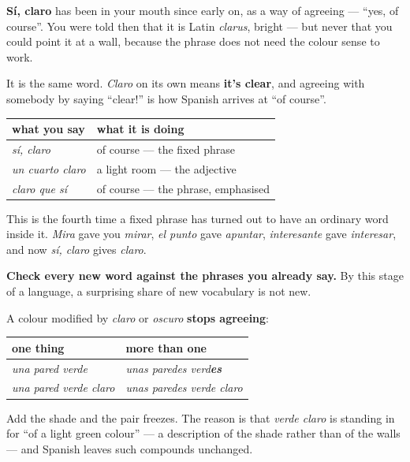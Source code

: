 \begin{grammarlens}[title={Grammar Lens: the word you have been using without meeting}]
\textbf{Sí, claro} has been in your mouth since early on, as a way of agreeing — \textquotedblleft{}yes, of course\textquotedblright{}. You were told then that it is Latin \emph{clarus}, bright — but never that you could point it at a wall, because the phrase does not need the colour sense to work.

It is the same word. \emph{Claro} on its own means \textbf{it's clear}, and agreeing with somebody by saying \textquotedblleft{}clear!\textquotedblright{} is how Spanish arrives at \textquotedblleft{}of course\textquotedblright{}.

\noindent
\begin{tabularx}{\linewidth}{@{}>{\raggedright\arraybackslash}X>{\raggedright\arraybackslash}X@{}}
\toprule
\textbf{what you say} & \textbf{what it is doing} \\
\midrule
\emph{sí, claro} & of course — the fixed phrase \\
\emph{un cuarto claro} & a light room — the adjective \\
\emph{claro que sí} & of course — the phrase, emphasised \\
\bottomrule
\end{tabularx}

This is the fourth time a fixed phrase has turned out to have an ordinary word inside it. \emph{Mira} gave you \emph{mirar}, \emph{el punto} gave \emph{apuntar}, \emph{interesante} gave \emph{interesar}, and now \emph{sí, claro} gives \emph{claro}.

\textbf{Check every new word against the phrases you already say.} By this stage of a language, a surprising share of new vocabulary is not new.
\end{grammarlens}

\begin{grammarlens}[title={Grammar Lens: colour words with claro and oscuro}]
A colour modified by \emph{claro} or \emph{oscuro} \textbf{stops agreeing}:

\noindent
\begin{tabularx}{\linewidth}{@{}>{\raggedright\arraybackslash}X>{\raggedright\arraybackslash}X@{}}
\toprule
\textbf{one thing} & \textbf{more than one} \\
\midrule
\emph{una pared verde} & \emph{unas paredes verd\textbf{es}} \\
\emph{una pared verde claro} & \emph{unas paredes verde claro} \\
\bottomrule
\end{tabularx}

Add the shade and the pair freezes. The reason is that \emph{verde claro} is standing in for \textquotedblleft{}of a light green colour\textquotedblright{} — a description of the shade rather than of the walls — and Spanish leaves such compounds unchanged.
\end{grammarlens}

